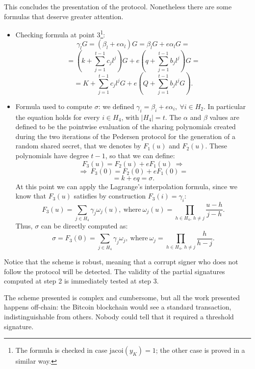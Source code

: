 This concludes the presentation of the protocol. Nonetheless there are some formulas that deserve greater attention.
\begin{itemize}
	\item Checking formula at point 3\footnote{The formula is checked in case $\text{jacoi}(y_K) = 1$; the other case is proved in a similar way.}: 
	$$\gamma_lG = (\beta_l + e\alpha_l)G = \beta_lG + e\alpha_lG = $$
	$$= \left(k + \sum_{j = 1}^{t - 1}c_jl^j\right)G + e\left(q + \sum_{j = 1}^{t - 1}b_jl^j\right)G =$$
	$$= K + \sum_{j = 1}^{t - 1}c_jl^jG + e\left(Q + \sum_{j = 1}^{t - 1}b_jl^jG\right).$$
	\item Formula used to compute $\sigma$: we defined $\gamma_i = \beta_i + e\alpha_i, \ \forall i \in H_2$. In particular the equation holds for every $i \in H_4$, with $|H_4| = t$. The $\alpha$ and $\beta$ values are defined to be the pointwise evaluation of the sharing polynomials created during the two iterations of the Pedersen protocol for the generation of a random shared secret, that we denotes by $F_1(u)$ and $F_2(u)$. These polynomials have degree $t - 1$, so that we can define:
	$$F_3(u) = F_2(u) + eF_1(u) \ \Longrightarrow $$
	$$\Longrightarrow \ F_3(0) = F_2(0) + eF_1(0) = $$
	$$= k + eq = \sigma.$$
	At this point we can apply the Lagrange's interpolation formula, since we know that $F_3(u)$ satisfies by construction $F_3(i) = \gamma_i$:
	$$F_3(u) = \sum_{j \in H_4}\gamma_j\omega_j(u), \ \text{where} \ \omega_j(u) = \prod_{h \in H_4, \ h \neq j}\frac{u - h}{j -h}.$$
	Thus, $\sigma$ can be directly computed as:
	$$\sigma = F_3(0) = \sum_{j \in H_4}\gamma_j\omega_j, \ \text{where} \ \omega_j = \prod_{h \in H_4, \ h \neq j}\frac{h}{h - j}.$$
\end{itemize}
Notice that the scheme is robust, meaning that a corrupt signer who does not follow the protocol will be detected. The validity of the partial signatures computed at step 2 is immediately tested at step 3.

\bigskip

\bigskip
\noindent
The scheme presented is complex and cumbersome, but all the work presented happens off-chain: the Bitcoin blockchain would see a standard transaction, indistinguishable from others. Nobody could tell that it required a threshold signature.

\bigskip

\bigskip

